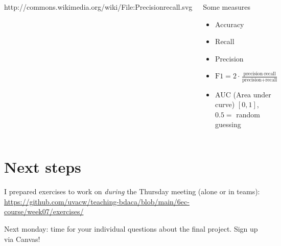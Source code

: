 \documentclass[compress]{beamer}
\begin{document}
\begin{frame}[plain]
	\begin{columns}[]
		
		{\tiny{http://commons.wikimedia.org/wiki/File:Precisionrecall.svg}}
		
		\begin{block}{Some measures}
			\begin{itemize}
				\item Accuracy
				\item Recall
				\item Precision
				\item $\text{F1}=2\cdot \frac{\text{precision}\cdot \text{recall}}{\text{precision}+\text{recall}}$
				\item AUC (Area under curve) $[0,1]$, $0.5=$ random guessing
			\end{itemize}
		\end{block}
		
	\end{columns}
	
\end{frame}





\section{Next steps}

\begin{frame}[standout]
I prepared exercises to work on \emph{during} the Thursday meeting (alone or in teams):
\large{\url{https://github.com/uvacw/teaching-bdaca/blob/main/6ec-course/week07/exercises/}}
\end{frame}

\begin{frame}[standout]
Next monday: time for your individual questions about the final project. 
Sign up via Canvas!
\end{frame}



\begin{frame}
	\printbibliography
\end{frame}
\end{document}
